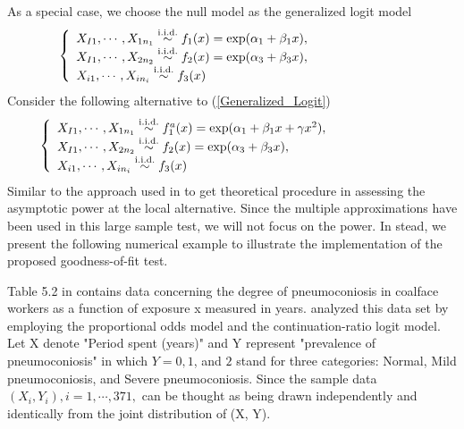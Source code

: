 \documentclass[11pt]{article}
\theoremstyle{plain}
\theoremstyle{definition}
\theoremstyle{remark}
\theoremstyle{definition}
\begin{document}
As a special case, we choose the null model as the generalized logit model
\begin{equation}
\left\{ \begin{array}{llll}
$$X_{I1}, \cdots, X_{1n_1} \stackrel{\mathrm{ i.i.d.}}{\sim}f_1(x)=\exp(\alpha_1+\beta_1x),\hspace{1.in}$$\\
$$X_{I1}, \cdots, X_{2n_2} \stackrel{\mathrm{ i.i.d.}}{\sim}f_2(x)=\exp(\alpha_3+\beta_3x),\hspace{1.in}$$\\
$$X_{i1}, \cdots, X_{in_i} \stackrel{\mathrm{ i.i.d.}}{\sim}f_3(x) $$
\end{array}\right.
\label{Generalized_Logit}
\end{equation}
Consider the following alternative to (\ref{Generalized_Logit})
\begin{equation}
\left\{ \begin{array}{llll}
$$X_{I1}, \cdots, X_{1n_1} \stackrel{\mathrm{ i.i.d.}}{\sim}f_1^a(x)=\exp(\alpha_1+\beta_1x+\gamma x^2),\hspace{1.in}$$\\
$$X_{I1}, \cdots, X_{2n_2} \stackrel{\mathrm{ i.i.d.}}{\sim}f_2(x)=\exp(\alpha_3+\beta_3x),\hspace{1.in}$$\\
$$X_{i1}, \cdots, X_{in_i} \stackrel{\mathrm{ i.i.d.}}{\sim}f_3(x) $$
\end{array}\right.
\label{Generalized_Logit_Ha}
\end{equation}
Similar to the approach used in \cite{ZhangBiao-JMA-2002} to get theoretical procedure in assessing the asymptotic power at the local alternative. Since the multiple approximations have been used in this large sample test, we will not focus on the power. In stead, we present the following numerical example to illustrate the implementation of the proposed goodness-of-fit test.

   Table 5.2 in \cite{McCullagh-Nelder-book-1989} contains
data concerning the degree of pneumoconiosis in coalface workers as
a function of exposure x measured in years. \cite{McCullagh-Nelder-book-1989}
analyzed this data set by employing the proportional odds model and the
continuation-ratio logit model. Let X denote "Period spent (years)" and Y represent "prevalence of pneumoconiosis" in which $Y=0, 1$, and $2$ stand for three categories: Normal, Mild pneumoconiosis,
and Severe pneumoconiosis. Since the sample data $(X_i, Y_i), i=1, \cdots, 371,$
can be thought as being drawn independently and identically from the joint
distribution of (X, Y).
\end{document}
